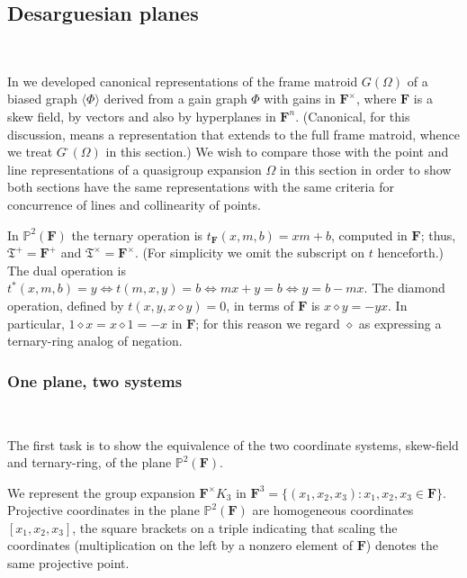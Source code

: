 \documentclass[reqno,12pt]{amsart}
\theoremstyle{remark}
\numberwithin{equation}{section}
\numberwithin{figure}{section}
\newcommand \bgr[1]{\langle#1\rangle}
\newcommand \full{^{{}^{{}_{{}_\bullet}}\!}}
\newcommand \bbP{\mathbb{P}}
\newcommand\fF{\mathbf{F}}	%
\newcommand \fT{\mathfrak T}
\newcommand\G{{G\full}}
\begin{document}
\subsection{Desarguesian planes}\label{q desargframe}\

In \cite[Section IV.2.1]{BG} we developed canonical representations of the frame matroid $G(\Omega)$ of a biased graph $\bgr{\Phi}$ derived from a gain graph $\Phi$ with gains in $\fF^\times$, where $\fF$ is a skew field, by vectors and also by hyperplanes in $\fF^n$.  (Canonical, for this discussion, means a representation that extends to the full frame matroid, whence we treat $\G(\Omega)$ in this section.)  We wish to compare those with the point and line representations of a quasigroup expansion $\Omega$ in this section in order to show both sections have the same representations with the same criteria for concurrence of lines and collinearity of points.  

In $\bbP^2(\fF)$ the ternary operation is $t_\fF(x,m,b) = xm+b$, computed in $\fF$; thus, $\fT^+ = \fF^+$ and $\fT^\times = \fF^\times$.  (For simplicity we omit the subscript on $t$ henceforth.)  
The dual operation is $t^*(x,m,b)=y \iff t(m,x,y)=b \iff mx+y=b \iff y=b-mx.$  
The diamond operation, defined by $t(x,y,x\diamond y)=0$, in terms of $\fF$ is $x\diamond y = -yx$.  In particular, $1\diamond x = x\diamond1 = -x$ in $\fF$; for this reason we regard $\diamond$ as expressing a ternary-ring analog of negation.

\subsubsection{One plane, two systems}\label{2systems}\

The first task is to show the equivalence of the two coordinate systems, skew-field and ternary-ring, of the plane $\bbP^2(\fF)$.  

We represent the group expansion $\fF^\times K_3$ in $\fF^3=\{(x_1,x_2,x_3): x_1,x_2,x_3 \in \fF\}$.  Projective coordinates in the plane $\bbP^2(\fF)$ are homogeneous coordinates $[x_1,x_2,x_3]$, the square brackets on a triple indicating that scaling the coordinates (multiplication on the left by a nonzero element of $\fF$) denotes the same projective point.  
\end{document}
